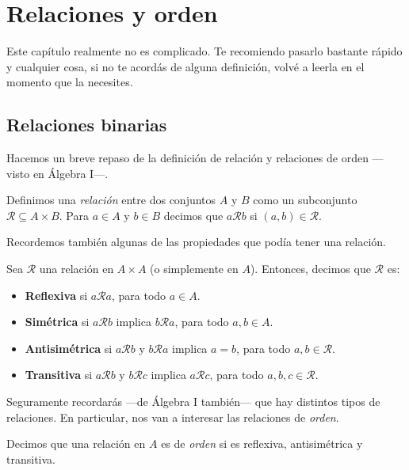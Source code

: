 \chapter{Relaciones y orden}

Este capítulo realmente no es complicado. Te recomiendo pasarlo bastante rápido y cualquier cosa, si no te acordás de alguna definición, volvé a leerla en el momento que la necesites.

\section{Relaciones binarias}

Hacemos un breve repaso de la definición de relación y relaciones de orden ---visto en Álgebra I---.

\begin{definition}
	Definimos una \emph{relación} entre dos conjuntos $A$ y $B$ como un subconjunto $\mathcal{R} \subseteq A \times B$. Para $a \in A$ y $b \in B$ decimos que $a \mathcal{R} b$ si $(a, b) \in \mathcal{R}$.
\end{definition}

Recordemos también algunas de las propiedades que podía tener una relación.

\begin{definition}
	Sea $\mathcal{R}$ una relación en $A \times A$ (o simplemente en $A$). Entonces, decimos que $\mathcal{R}$ es:
	\begin{itemize}
		\item \textbf{Reflexiva} si $a \mathcal{R} a$, para todo $a \in A$.
		\item \textbf{Simétrica} si $a \mathcal{R} b$ implica $b \mathcal{R} a$, para todo $a, b \in A$.
		\item \textbf{Antisimétrica} si $a \mathcal{R} b$ y $b \mathcal{R} a$ implica $a = b$, para todo $a, b \in \mathcal{R}$.
		\item \textbf{Transitiva} si $a \mathcal{R} b$ y $b \mathcal{R} c$ implica $a \mathcal{R} c$, para todo $a, b, c \in \mathcal{R}$.
	\end{itemize}
\end{definition}

Seguramente recordarás ---de Álgebra I también--- que hay distintos tipos de relaciones. En particular, nos van a interesar las relaciones de \textit{orden}.

\begin{definition}
	Decimos que una relación en $A$ es de \emph{orden} si es reflexiva, antisimétrica y transitiva.
\end{definition}

